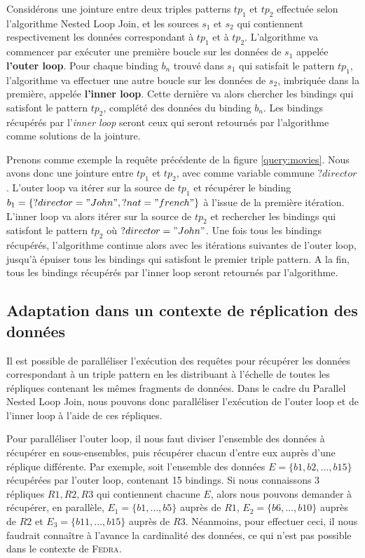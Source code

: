\documentclass[a4paper]{article}
\def\fedra{\textsc{Fedra}\xspace}
\begin{document}
Considérons une jointure entre deux triples patterns $tp_1$ et $tp_2$ effectuée selon l'algorithme Nested Loop Join, et les sources $s_1$ et $s_2$ qui contiennent respectivement les données correspondant à $tp_1$ et à $tp_2$. L'algorithme va commencer par exécuter une première boucle sur les données de $s_1$ appelée \textbf{l'outer loop}. Pour chaque binding $b_n$ trouvé dans $s_1$ qui satisfait le pattern $tp_1$, l'algorithme va effectuer une autre boucle sur les données de $s_2$, imbriquée dans la première, appelée \textbf{l'inner loop}. Cette dernière va alors chercher les bindings qui satisfont le pattern $tp_2$, complété des données du binding $b_n$. Les bindings récupérés par l'\textit{inner loop} seront ceux qui seront retournés par l'algorithme comme solutions de la jointure.

Prenons comme exemple la requête précédente de la figure \ref{query:movies}. Nous avons donc une jointure entre $tp_1$ et $tp_2$, avec comme variable commune $?director$. L'outer loop va itérer sur la source de $tp_1$ et récupérer le binding $b_1 = \{ ?director = "John", ?nat = "french" \}$ à l'issue de la première itération. L'inner loop va alors itérer sur la source de $tp_2$ et rechercher les bindings qui satisfont le pattern $tp_2$ où $?director = "John"$. Une fois tous les bindings récupérés, l'algorithme continue alors avec les itérations suivantes de l'outer loop, jusqu'à épuiser tous les bindings qui satisfont le premier triple pattern. A la fin, tous les bindings récupérés par l'inner loop seront retournés par l'algorithme.

\subsection{Adaptation dans un contexte de réplication des données}

Il est possible de paralléliser l'exécution des requêtes pour récupérer les données correspondant à un triple pattern en les distribuant à l'échelle de toutes les répliques contenant les mêmes fragments de données. Dans le cadre du Parallel Nested Loop Join, nous pouvons donc paralléliser l'exécution de l'outer loop et de l'inner loop à l'aide de ces répliques.

Pour paralléliser l'outer loop, il nous faut diviser l'ensemble des données à récupérer en sous-ensembles, puis récupérer chacun d'entre eux auprès d'une réplique différente. Par exemple, soit l'ensemble des données $E = \{ b1, b2, \dots, b15 \}$ récupérées par l'outer loop, contenant 15 bindings. Si nous connaissons 3 répliques $R1, R2, R3$ qui contiennent chacune $E$, alors nous pouvons demander à récupérer, en parallèle, $E_1 = \{ b1, \dots, b5 \}$ auprès de $R1$, $E_2 = \{ b6, \dots, b10 \}$ auprès de $R2$ et $E_3 = \{ b11, \dots, b15 \}$ auprès de $R3$. Néanmoins, pour effectuer ceci, il nous faudrait connaître à l'avance la cardinalité des données, ce qui n'est pas possible dans le contexte de \fedra. 
\end{document}
